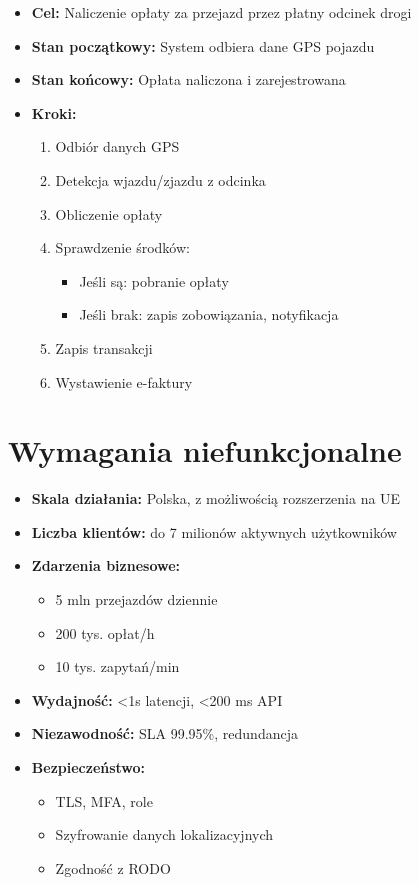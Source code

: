 \documentclass[a4paper,12pt]{article}
\theoremstyle{definition}
\begin{document}
\begin{itemize}
  \item \textbf{Cel:} Naliczenie opłaty za przejazd przez płatny odcinek drogi
  \item \textbf{Stan początkowy:} System odbiera dane GPS pojazdu
  \item \textbf{Stan końcowy:} Opłata naliczona i zarejestrowana
  \item \textbf{Kroki:}
  \begin{enumerate}
    \item Odbiór danych GPS
    \item Detekcja wjazdu/zjazdu z odcinka
    \item Obliczenie opłaty
    \item Sprawdzenie środków:
      \begin{itemize}
        \item Jeśli są: pobranie opłaty
        \item Jeśli brak: zapis zobowiązania, notyfikacja
      \end{itemize}
    \item Zapis transakcji
    \item Wystawienie e-faktury
  \end{enumerate}
\end{itemize}

\section{Wymagania niefunkcjonalne}

\begin{itemize}
  \item \textbf{Skala działania:} Polska, z możliwością rozszerzenia na UE
  \item \textbf{Liczba klientów:} do 7 milionów aktywnych użytkowników
  \item \textbf{Zdarzenia biznesowe:}
  \begin{itemize}
    \item 5 mln przejazdów dziennie
    \item 200 tys. opłat/h
    \item 10 tys. zapytań/min
  \end{itemize}
  \item \textbf{Wydajność:} <1s latencji, \textless 200 ms API
  \item \textbf{Niezawodność:} SLA 99.95\%, redundancja
  \item \textbf{Bezpieczeństwo:}
  \begin{itemize}
    \item TLS, MFA, role
    \item Szyfrowanie danych lokalizacyjnych
    \item Zgodność z RODO
  \end{itemize}
\end{itemize}
\end{document}
